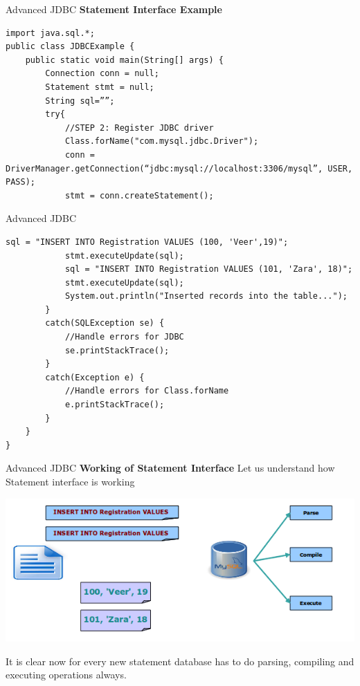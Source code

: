 \documentclass[14pt]{beamer}
\begin{document}
\begin{frame}[fragile]{Advanced JDBC}
\textbf{Statement Interface Example}
\begin{lstlisting}[numbers=none]
import java.sql.*;
public class JDBCExample {
    public static void main(String[] args) {
        Connection conn = null;
        Statement stmt = null;
        String sql=””;
        try{
            //STEP 2: Register JDBC driver
            Class.forName("com.mysql.jdbc.Driver");
            conn = DriverManager.getConnection(“jdbc:mysql://localhost:3306/mysql”, USER, PASS);
            stmt = conn.createStatement();
\end{lstlisting}
\end{frame}
\begin{frame}[fragile]{Advanced JDBC}
\begin{lstlisting}[numbers=none]
            sql = "INSERT INTO Registration VALUES (100, 'Veer',19)";   
            stmt.executeUpdate(sql);
            sql = "INSERT INTO Registration VALUES (101, 'Zara', 18)";
            stmt.executeUpdate(sql);
            System.out.println("Inserted records into the table...");
        }
        catch(SQLException se) {
            //Handle errors for JDBC
            se.printStackTrace();
        }
        catch(Exception e) {
            //Handle errors for Class.forName
            e.printStackTrace();
        }
    }
}
\end{lstlisting}
\end{frame}

\begin{frame}{Advanced JDBC}
\textbf{Working of Statement Interface}
Let us understand how Statement interface is working
\begin{center}
    \includegraphics[scale=0.5]{JEE-M03-S02-Image1.png}
  \end{center}
It is clear now for every new statement database has to do parsing, compiling and executing operations always.
\end{frame}
\end{document}
